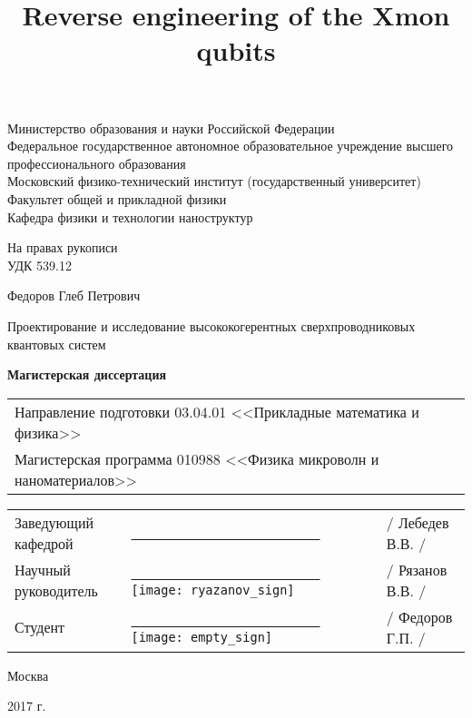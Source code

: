 \documentclass[12pt, twoside]{report}
\title{Reverse engineering of the Xmon qubits}
\numberwithin{equation}{section}
\begin{document}
\begin{titlepage}
\par 
\vspace*{-2cm}
\begin{center}
Министерство образования и науки Российской Федерации\\
Федеральное государственное автономное образовательное учреждение высшего\\ 
профессионального образования \\
\glqq Московский физико-технический институт (государственный университет) \grqq \\
Факультет общей и прикладной физики\\
Кафедра физики и технологии наноструктур
\end{center}

\vspace*{0.2cm}
\begin{flushright}
На правах рукописи\\
УДК 539.12
\end{flushright}

\vfill

\begin{center}
Федоров Глеб Петрович

\vspace*{0.5cm}

{\large Проектирование и исследование высококогерентных сверхпроводниковых квантовых систем}

\vspace*{1cm}

{\bf Магистерская диссертация}

\vspace*{1cm}

\begin{tabular*}{0.8\textwidth}{l}
Направление подготовки 03.04.01 <<Прикладные математика и физика>>\\
Магистерская программа 010988 <<Физика микроволн и наноматериалов>>\\
\end{tabular*}

\vspace*{2cm}

\begin{tabular*}{0.8\textwidth}{lll}
Заведующий кафедрой & \underline{\ \ \ \ \ \ \ \ \ \ \ \ \ \ \ \ \ \ \ \ \ \ \ \ \ \ } &	/ Лебедев В.В. / \\
Научный руководитель & \underline{\ \ \ \ \ \ \ \ \ \ \ \ \ \ \ \ \ \ \ \ \ \ \ \ \ \ } \hspace*{-4cm} \texttt{[image: ryazanov\_sign]}& / Рязанов В.В. / \\
Студент		    & \underline{\ \ \ \ \ \ \ \ \ \ \ \ \ \ \ \ \ \ \ \ \ \ \ \ \ \ } \hspace*{-4cm} \texttt{[image: empty\_sign]} & / Федоров Г.П. / \\
\end{tabular*}

\vfill

Москва

2017 г. 
\end {center} 
\end{titlepage}
\end{document}
